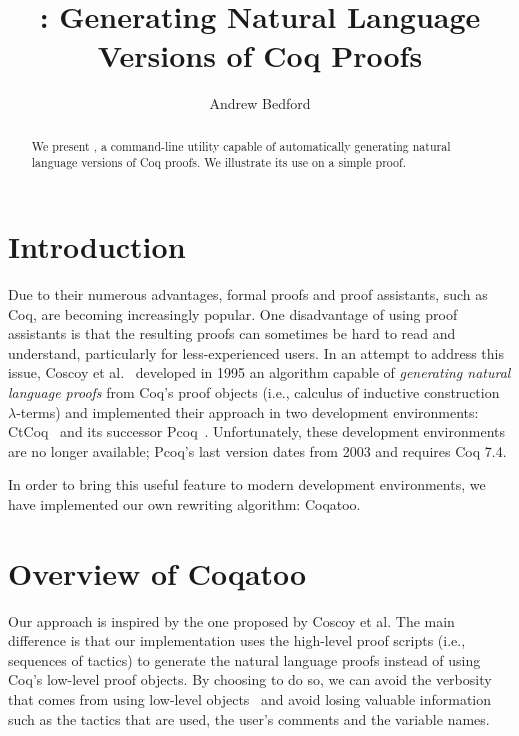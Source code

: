 \documentclass[sigplan,review,9pt]{acmart}\settopmatter{printfolios=true,printccs=false,printacmref=false}
\begin{document}
\title[Coqatoo]{\coqatoo: Generating Natural Language Versions of Coq Proofs}


\author{Andrew Bedford}


\begin{abstract}
  We present \coqatoo, a command-line utility capable of automatically generating natural language versions of Coq proofs. We illustrate its use on a simple proof.
\end{abstract}

\maketitle

\section{Introduction}
Due to their numerous advantages, formal proofs and proof assistants, such as Coq, are becoming increasingly popular. One disadvantage of using proof assistants is that the resulting proofs can sometimes be hard to read and understand, particularly for less-experienced users. In an attempt to address this issue, Coscoy et al.~\cite{DBLP:conf/tlca/CoscoyKT95} developed in 1995 an algorithm capable of \emph{generating natural language proofs} from Coq's proof objects (i.e., calculus of inductive construction $\lambda$-terms) and implemented their approach in two development environments: CtCoq~\cite{CtCoq} and its successor Pcoq~\cite{Pcoq}. Unfortunately, these development environments are no longer available; Pcoq's last version dates from 2003 and requires Coq 7.4.

In order to bring this useful feature to modern development environments, we have implemented our own rewriting algorithm: Coqatoo.


\section{Overview of Coqatoo}
Our approach is inspired by the one proposed by Coscoy et al. The main difference is that our implementation uses the high-level proof scripts (i.e., sequences of tactics) to generate the natural language proofs instead of using Coq's low-level proof objects. By choosing to do so, we can avoid the verbosity that comes from using low-level objects~\cite{DBLP:conf/lacl/Coscoy96} and avoid losing valuable information such as the tactics that are used, the user's comments and the variable names. 
\end{document}
